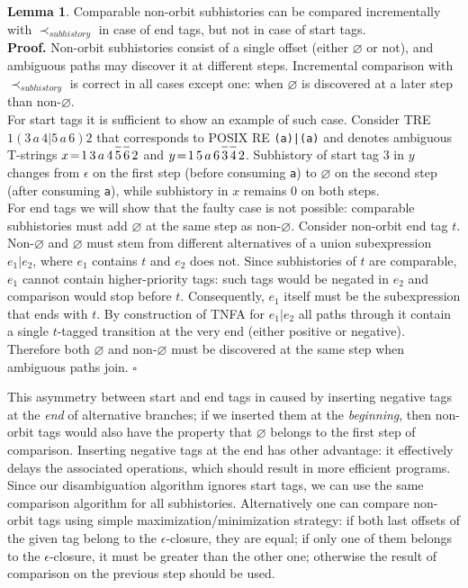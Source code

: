 \documentclass{article}
\newcommand{\Xeq}{\!=\!}
\newcommand*{\Xbar}[1]{\overline{#1\vphantom{\bar{#1}}}}
\theoremstyle{definition}
\newtheorem{XLem}{Lemma}
\begin{document}
\begin{multicols}{2}
\begin{XLem}\label{lemma_nonorbit_end_subhistories}
Comparable non-orbit subhistories can be compared incrementally with $\prec_{subhistory}$
in case of end tags, but not in case of start tags.
\\[0.5em]
\textbf{Proof.}
Non-orbit subhistories consist of a single offset (either $\varnothing$ or not),
and ambiguous paths may discover it at different steps.
Incremental comparison with $\prec_{subhistory}$ is correct in all cases except one:
when $\varnothing$ is discovered at a later step than non-$\varnothing$.
\\[0.5em]
For start tags it is sufficient to show an example of such case.
Consider TRE $1 (3 \, a \, 4 | 5 \, a \, 6) 2$ that corresponds to POSIX RE \texttt{(a)|(a)}
and denotes ambiguous T-strings $x \Xeq 1 \, 3 \, a \, 4 \, \Xbar{5} \, \Xbar{6} \, 2$
and $y \Xeq 1 \, 5 \, a \, 6 \, \Xbar{3} \, \Xbar{4} \, 2$.
Subhistory of start tag $3$ in $y$ changes from $\epsilon$ on the first step (before consuming \texttt{a})
to $\varnothing$ on the second step (after consuming \texttt{a}),
while subhistory in $x$ remains $0$ on both steps.
\\[0.5em]
For end tags we will show that the faulty case is not possible:
comparable subhistories must add $\varnothing$ at the same step as non-$\varnothing$.
Consider non-orbit end tag $t$.
Non-$\varnothing$ and $\varnothing$ must stem from different alternatives of a union subexpression $e_1 | e_2$,
where $e_1$ contains $t$ and $e_2$ does not.
Since subhistories of $t$ are comparable, $e_1$ cannot contain higher-priority tags:
such tags would be negated in $e_2$ and comparison would stop before $t$.
Consequently, $e_1$ itself must be the subexpression that ends with $t$.
By construction of TNFA for $e_1 | e_2$
all paths through it contain a single $t$-tagged transition at the very end (either positive or negative).
Therefore both $\varnothing$ and non-$\varnothing$ must be discovered at the same step when ambiguous paths join.
$\square$
\end{XLem}

This asymmetry between start and end tags in caused by inserting negative tags
at the \emph{end} of alternative branches;
if we inserted them at the \emph{beginning},
then non-orbit tags would also have the property that $\varnothing$ belongs to the first step of comparison.
Inserting negative tags at the end has other advantage: it effectively delays the associated operations,
which should result in more efficient programs.
Since our disambiguation algorithm ignores start tags,
we can use the same comparison algorithm for all subhistories.
Alternatively one can compare non-orbit tags using simple maximization/minimization strategy:
if both last offsets of the given tag belong to the $\epsilon$-closure, they are equal;
if only one of them belongs to the $\epsilon$-closure, it must be greater than the other one;
otherwise the result of comparison on the previous step should be used.
\\


\end{multicols}
\end{document}
